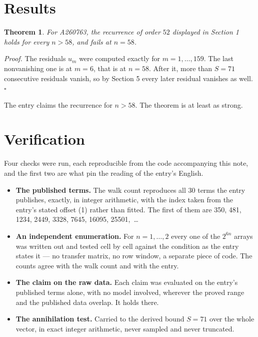 \documentclass[11pt]{article}
\newtheorem{theorem}{Theorem}
\theoremstyle{definition}
\begin{document}
\section{Results}

\begin{theorem} For A260763, the recurrence of order $52$ displayed in Section 1 holds for every $n > 58$, and fails at $n = 58$.\end{theorem}

{\itshape Proof.} The residuals $u_m$ were computed exactly for $m = 1,\dots,159$. The last nonvanishing one is at $m = 6$, that is at $n = 58$. After it, more than $S = 71$ consecutive residuals vanish, so by Section 5 every later residual vanishes as well. $\square$

The entry claims the recurrence for $n > 58$. The theorem is at least as strong.

\section{Verification}

Four checks were run, each reproducible from the code accompanying this note, and the first two are what pin the reading of the entry's English.

\begin{itemize}

\item {\bfseries The published terms.} The walk count reproduces all 30 terms the entry publishes, exactly, in integer arithmetic, with the index taken from the entry's stated offset (1) rather than fitted. The first of them are 350, 481, 1234, 2449, 3328, 7645, 16095, 25501,~\dots

\item {\bfseries An independent enumeration.} For $n = 1,\dots,2$ every one of the $2^{6n}$ arrays was written out and tested cell by cell against the condition as the entry states it --- no transfer matrix, no row window, a separate piece of code. The counts agree with the walk count and with the entry.

\item {\bfseries The claim on the raw data.} Each claim was evaluated on the entry's published terms alone, with no model involved, wherever the proved range and the published data overlap. It holds there.

\item {\bfseries The annihilation test.} Carried to the derived bound $S = 71$ over the whole vector, in exact integer arithmetic, never sampled and never truncated.

\end{itemize}
\end{document}

